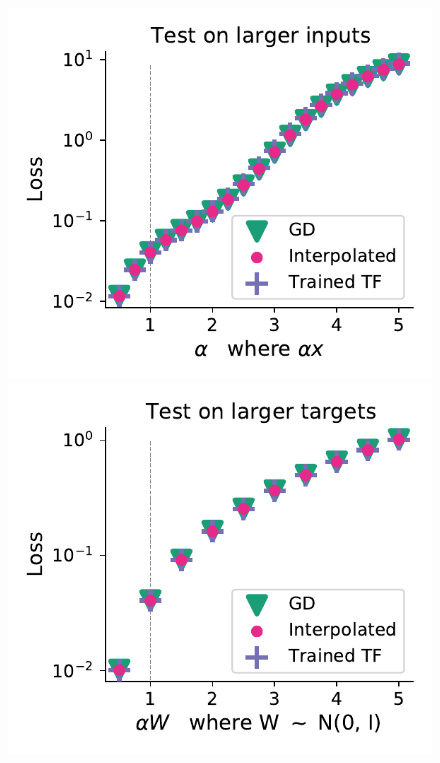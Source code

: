 \documentclass{article}
\theoremstyle{plain}
\theoremstyle{definition}
\theoremstyle{remark}
\begin{document}
\begin{figure}
\begin{center}
\begin{minipage}{.24\textwidth}
\begin{center}
  \end{center}
  \vspace{-10pt}
\end{minipage}
\begin{minipage}{.24\textwidth}
  \centering
  \begin{center}
    \includegraphics[width=1.\textwidth]{Final_figures/linear/linear_one_layer_one_head_0_002/normal_5.pdf}
  \end{center}
  \vspace{-10pt}
\end{minipage}
\begin{minipage}{.24\textwidth}
  \centering
  \begin{center}
    \includegraphics[width=1.\textwidth]{Final_figures/linear/linear_one_layer_one_head_0_002/ood_3.pdf}
  \end{center}
  \vspace{-10pt}
\end{minipage}


\end{center}
\end{figure}
\end{document}
